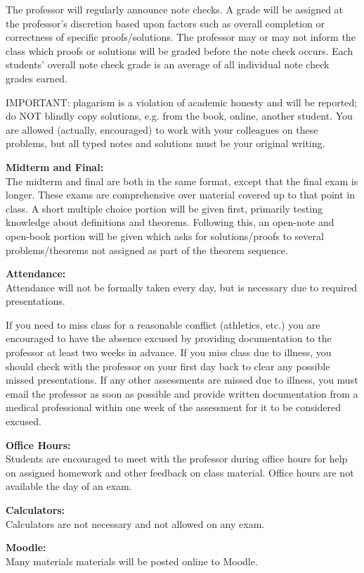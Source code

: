 {The professor will regularly announce
note checks. A grade will be assigned at the professor's discretion based
upon factors such as overall completion or correctness of specific
proofs/solutions.
The professor may or may not inform the class which proofs or solutions will
be graded before the note check occurs.
Each students' overall note check grade is an average of all individual
note check grades earned.

IMPORTANT: plagarism is a violation
of academic honesty and will be reported; do NOT blindly copy solutions, e.g.
from the book, online, another student.
You are allowed (actually, encouraged) to work
with your colleagues on these problems, but all typed notes and solutions
must be your original writing.

\textbf{Midterm and Final:} \\
The midterm and final are both in the same format, except that the final
exam is longer. These exams are comprehensive over material covered up
to that point in class. A short multiple choice portion will be given first,
primarily testing knowledge about definitions and theorems. Following this, an
open-note and open-book portion will be given which asks for solutions/proofs
to several problems/theorems not assigned as part of the theorem sequence.

\textbf{Attendance:} \\
Attendance will not be formally taken every day, but is necessary due to
required presentations.

If you need to miss
class for a reasonable conflict (athletics, etc.) you are encouraged to
have the absence excused by providing documentation to
the professor at least two weeks in advance.
If you miss class due to illness, you should check with the professor
on your first day back to clear any possible missed presentations.
If any other assessments are missed due to illness, you
must email the professor as soon as possible and provide written
documentation from a medical professional within one week of the assessment
for it to be considered excused.

\textbf{Office Hours:} \\
Students are encouraged to meet with the professor during office hours
for help on assigned homework and other feedback on class material.
Office hours are not available the day of an exam.

\textbf{Calculators:} \\
Calculators are not necessary and not allowed on any exam.

\textbf{Moodle:}\\
Many materials materials will be posted online to Moodle.
}

